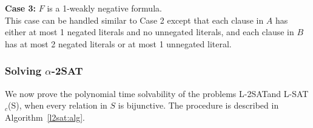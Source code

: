 \noindent
{\bf Case 3:}  $F$ is a 1-weakly negative formula.\\
This case can be handled similar to Case 2 except that each clause in $A$
has either at most 1 negated literals and no unnegated
literals, and each clause in $B$ has at most 2 negated literals or at most
1 unnegated literal. \hfill\QED


\subsubsection*{Solving $\alpha$-2SAT}
We now prove the polynomial time solvability of the problems {\sf L-2SAT}and
{\sf L-SAT$_c$(S)}, when every relation in $S$ is bijunctive. 
The procedure is described in Algorithm~\ref{l2sat:alg}.



\smallspacing
